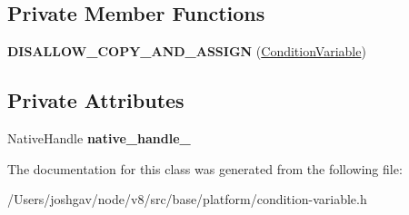 \subsection*{Private Member Functions}
\begin{DoxyCompactItemize}
\item 
{\bfseries D\+I\+S\+A\+L\+L\+O\+W\+\_\+\+C\+O\+P\+Y\+\_\+\+A\+N\+D\+\_\+\+A\+S\+S\+I\+GN} (\hyperlink{classv8_1_1base_1_1_condition_variable}{Condition\+Variable})\hypertarget{classv8_1_1base_1_1_condition_variable_a2ee53cb54c0b6dc5c862ba6b335f3fd8}{}\label{classv8_1_1base_1_1_condition_variable_a2ee53cb54c0b6dc5c862ba6b335f3fd8}

\end{DoxyCompactItemize}
\subsection*{Private Attributes}
\begin{DoxyCompactItemize}
\item 
Native\+Handle {\bfseries native\+\_\+handle\+\_\+}\hypertarget{classv8_1_1base_1_1_condition_variable_ae99939db580c63c102c3a671ff200c73}{}\label{classv8_1_1base_1_1_condition_variable_ae99939db580c63c102c3a671ff200c73}

\end{DoxyCompactItemize}


The documentation for this class was generated from the following file\+:\begin{DoxyCompactItemize}
\item 
/\+Users/joshgav/node/v8/src/base/platform/condition-\/variable.\+h\end{DoxyCompactItemize}
